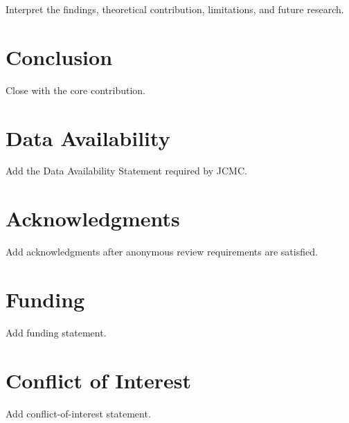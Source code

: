 \documentclass[unnumsec,webpdf,contemporary,large]{oup-authoring-template}
\begin{document}
Interpret the findings, theoretical contribution, limitations, and future research.

\section{Conclusion}

Close with the core contribution.

\section*{Data Availability}

Add the Data Availability Statement required by JCMC.

\section*{Acknowledgments}

Add acknowledgments after anonymous review requirements are satisfied.

\section*{Funding}

Add funding statement.

\section*{Conflict of Interest}

Add conflict-of-interest statement.



\end{document}
